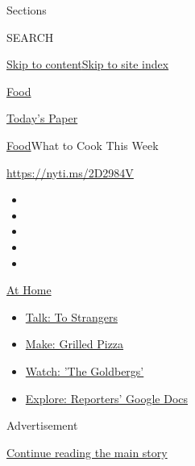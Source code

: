 Sections

SEARCH

\protect\hyperlink{site-content}{Skip to
content}\protect\hyperlink{site-index}{Skip to site index}

\href{https://www.nytimes.com/section/food}{Food}

\href{https://myaccount.nytimes.com/auth/login?response_type=cookie\&client_id=vi}{}

\href{https://www.nytimes.com/section/todayspaper}{Today's Paper}

\href{/section/food}{Food}\textbar{}What to Cook This Week

\url{https://nyti.ms/2D2984V}

\begin{itemize}
\item
\item
\item
\item
\item
\end{itemize}

\href{https://www.nytimes.com/spotlight/at-home?action=click\&pgtype=Article\&state=default\&region=TOP_BANNER\&context=at_home_menu}{At
Home}

\begin{itemize}
\tightlist
\item
  \href{https://www.nytimes.com/2020/08/03/well/family/the-benefits-of-talking-to-strangers.html?action=click\&pgtype=Article\&state=default\&region=TOP_BANNER\&context=at_home_menu}{Talk:
  To Strangers}
\item
  \href{https://www.nytimes.com/2020/08/01/at-home/coronavirus-make-pizza-on-a-grill.html?action=click\&pgtype=Article\&state=default\&region=TOP_BANNER\&context=at_home_menu}{Make:
  Grilled Pizza}
\item
  \href{https://www.nytimes.com/2020/07/31/arts/television/goldbergs-abc-stream.html?action=click\&pgtype=Article\&state=default\&region=TOP_BANNER\&context=at_home_menu}{Watch:
  'The Goldbergs'}
\item
  \href{https://www.nytimes.com/interactive/2020/at-home/even-more-reporters-editors-diaries-lists-recommendations.html?action=click\&pgtype=Article\&state=default\&region=TOP_BANNER\&context=at_home_menu}{Explore:
  Reporters' Google Docs}
\end{itemize}

Advertisement

\protect\hyperlink{after-top}{Continue reading the main story}

